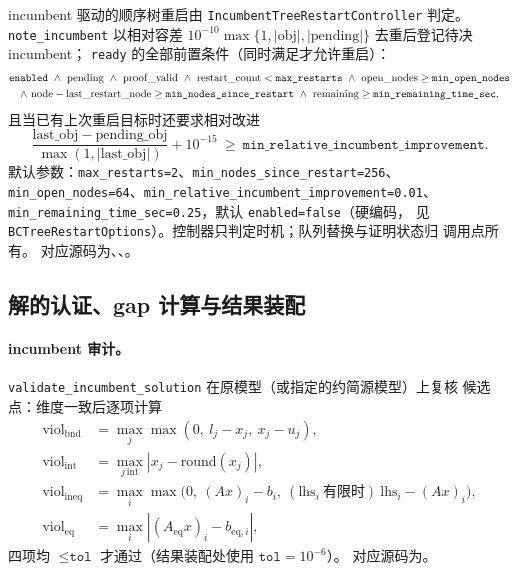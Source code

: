 incumbent 驱动的顺序树重启由 \texttt{IncumbentTreeRestartController} 判定。
\texttt{note\_incumbent} 以相对容差
$10^{-10}\max\{1,|\mathrm{obj}|,|\mathrm{pending}|\}$ 去重后登记待决 incumbent；
\texttt{ready} 的全部前置条件（同时满足才允许重启）：
\begin{gather}
  \texttt{enabled}\ \land\ \mathrm{pending}\ \land\ \mathrm{proof\_valid}
  \ \land\ \mathrm{restart\_count}<\texttt{max\_restarts}\
  \land\ \mathrm{open\_nodes}\ge\texttt{min\_open\_nodes}\notag\\
  \land\ \mathrm{node}-\mathrm{last\_restart\_node}\ge
    \texttt{min\_nodes\_since\_restart}
  \ \land\ \mathrm{remaining}\ge\texttt{min\_remaining\_time\_sec},
\end{gather}
且当已有上次重启目标时还要求相对改进
\begin{equation}
  \frac{\mathrm{last\_obj}-\mathrm{pending\_obj}}
       {\max(1,|\mathrm{last\_obj}|)}+10^{-15}
  \ \ge\ \texttt{min\_relative\_incumbent\_improvement}.
\end{equation}
默认参数：\texttt{max\_restarts=2}、\texttt{min\_nodes\_since\_restart=256}、
\texttt{min\_open\_nodes=64}、\texttt{min\_relative\_incumbent\_improvement=0.01}、
\texttt{min\_remaining\_time\_sec=0.25}，默认 \texttt{enabled=false}（硬编码，
见 \texttt{BCTreeRestartOptions}）。控制器只判定时机；队列替换与证明状态归
调用点所有。
对应源码为、、。

\subsection{解的认证、gap 计算与结果装配}\label{subsec:milpbc-cert}

\paragraph{incumbent 审计。}
\texttt{validate\_incumbent\_solution} 在原模型（或指定的约简源模型）上复核
候选点：维度一致后逐项计算
\begin{align}
  \mathrm{viol}_{\mathrm{bnd}}&=\max_j\max(0,\ l_j-x_j,\ x_j-u_j),\\
  \mathrm{viol}_{\mathrm{int}}&=\max_{j\,\mathrm{int}}|x_j-\mathrm{round}(x_j)|,\\
  \mathrm{viol}_{\mathrm{ineq}}&=\max_i\max\bigl(0,\ (Ax)_i-b_i,\
  (\mathrm{lhs}_i\ \text{有限时})\ \mathrm{lhs}_i-(Ax)_i\bigr),\\
  \mathrm{viol}_{\mathrm{eq}}&=\max_i|(A_{\mathrm{eq}}x)_i-b_{\mathrm{eq},i}|,
\end{align}
四项均 $\le\texttt{tol}$ 才通过（结果装配处使用 $\texttt{tol}=10^{-6}$）。
对应源码为。


